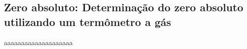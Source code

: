\subsection{Zero absoluto: Determinação do zero absoluto utilizando um termômetro a
gás}

aaaaaaaaaaaaaaaaaaaa
